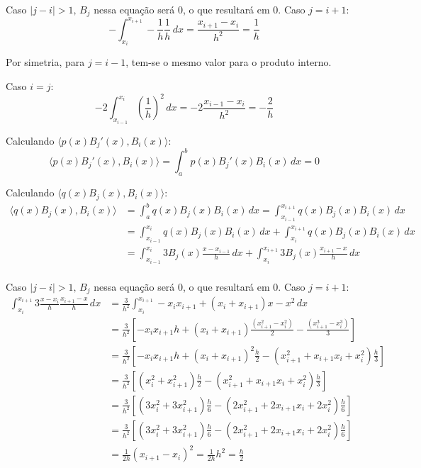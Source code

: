 \documentclass{article}
\begin{document}
    Caso $ |j - i| > 1, \, B_j$ nessa equa\c{c}\~ao ser\'a 0, o que resultar\'a em 0.
    Caso $ j = i + 1 $:
    $$ -\int_{x_i}^{x_{i+1}} -\frac{1}{h} \frac{1}{h} \, dx = \frac{x_{i+1} - x_i}{h^2} = \frac{1}{h}$$

    Por simetria, para $ j = i - 1 $, tem-se o mesmo valor para o produto interno.

    Caso $i = j$:
    $$ -2\int_{x_{i-1}}^{x_i} \left(\frac{1}{h}\right)^2 \, dx = -2\frac{x_{i-1}-x_i}{h^2} = -\frac{2}{h}$$

    Calculando $\langle p(x)B_j'(x), B_i(x)\rangle$:
    $$ \langle p(x)B_j'(x), B_i(x)\rangle = \int_a^b p(x) B_j'(x) B_i(x)\, dx = 0 $$

    Calculando $\langle q(x)B_j(x), B_i(x)\rangle$:
    \begin{align*} \langle q(x)B_j(x), B_i(x)\rangle & = \int_a^b q(x) B_j(x) B_i(x)\, dx = \int_{x_{i - 1}}^{x_{i + 1}} q(x) B_j(x) B_i(x)\, dx\\
    & = \int_{x_{i - 1}}^{x_{i}} q(x) B_j(x) B_i(x)\, dx + \int_{x_{i}}^{x_{i + 1}} q(x) B_j(x) B_i(x)\, dx \\
    & = \int_{x_{i - 1}}^{x_{i}} 3 B_j(x) \frac{x-x_{i-1}}{h}\, dx + \int_{x_{i}}^{x_{i + 1}} 3 B_j(x) \frac{x_{i+1}-x}{h}\, dx \\
    \end{align*}

    Caso $ |j - i| > 1, \, B_j$ nessa equa\c{c}\~ao ser\'a 0, o que resultar\'a em 0.
    Caso $ j = i + 1 $:
    \begin{align*}
        \int_{x_{i}}^{x_{i + 1}} 3 \frac{x-x_i}{h} \frac{x_{i+1}-x}{h} \, dx &= \frac{3}{h^2} \int_{x_{i}}^{x_{i + 1}} -x_ix_{i + 1} + (x_i + x_{i + 1})x - x^2 \, dx \\
        &= \frac{3}{h^2} [-x_ix_{i + 1}h + (x_i + x_{i + 1})\frac{(x_{i + 1}^2 - x_i^2)}{2} - \frac{(x_{i + 1}^3 - x_i^3)}{3}] \\
        &= \frac{3}{h^2} [-x_ix_{i + 1}h + (x_i + x_{i + 1})^2 \frac{h}{2} - (x_{i + 1}^2 + x_{i + 1}x_i + x_i^2)\frac{h}{3}] \\
        &= \frac{3}{h^2} [(x_i^2 + x_{i + 1}^2) \frac{h}{2} - (x_{i + 1}^2 + x_{i + 1}x_i + x_i^2)\frac{h}{3}] \\
        &= \frac{3}{h^2} [(3x_i^2 + 3x_{i + 1}^2) \frac{h}{6} - (2x_{i + 1}^2 + 2x_{i + 1}x_i + 2x_i^2)\frac{h}{6}] \\
        &= \frac{3}{h^2} [(3x_i^2 + 3x_{i + 1}^2) \frac{h}{6} - (2x_{i + 1}^2 + 2x_{i + 1}x_i + 2x_i^2)\frac{h}{6}] \\
        &= \frac{1}{2h} (x_{i + 1} - x_i)^2 = \frac{1}{2h} h^2 = \frac{h}{2} \\
    \end{align*}
    
\end{document}
